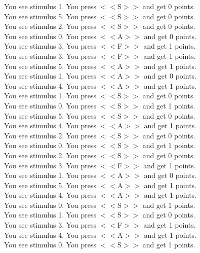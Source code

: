 \documentclass[pdflatex,sn-nature]{sn-jnl}%
\theoremstyle{thmstyleone}%
\theoremstyle{thmstyletwo}%
\theoremstyle{thmstylethree}%
\begin{document}
You see stimulus 1. You press $<<$S$>>$ and get 0 points. $~$\\ 
You see stimulus 5. You press $<<$S$>>$ and get 0 points. $~$\\ 
You see stimulus 2. You press $<<$S$>>$ and get 0 points. $~$\\ 
You see stimulus 0. You press $<<$A$>>$ and get 0 points. $~$\\ 
You see stimulus 3. You press $<<$F$>>$ and get 1 points. $~$\\ 
You see stimulus 3. You press $<<$F$>>$ and get 1 points. $~$\\ 
You see stimulus 5. You press $<<$A$>>$ and get 1 points. $~$\\ 
You see stimulus 1. You press $<<$A$>>$ and get 0 points. $~$\\ 
You see stimulus 4. You press $<<$A$>>$ and get 1 points. $~$\\ 
You see stimulus 1. You press $<<$S$>>$ and get 0 points. $~$\\ 
You see stimulus 0. You press $<<$S$>>$ and get 1 points. $~$\\ 
You see stimulus 5. You press $<<$S$>>$ and get 0 points. $~$\\ 
You see stimulus 4. You press $<<$A$>>$ and get 1 points. $~$\\ 
You see stimulus 2. You press $<<$S$>>$ and get 0 points. $~$\\ 
You see stimulus 0. You press $<<$S$>>$ and get 1 points. $~$\\ 
You see stimulus 2. You press $<<$S$>>$ and get 0 points. $~$\\ 
You see stimulus 3. You press $<<$F$>>$ and get 1 points. $~$\\ 
You see stimulus 1. You press $<<$A$>>$ and get 0 points. $~$\\ 
You see stimulus 5. You press $<<$A$>>$ and get 1 points. $~$\\ 
You see stimulus 4. You press $<<$A$>>$ and get 1 points. $~$\\ 
You see stimulus 0. You press $<<$S$>>$ and get 1 points. $~$\\ 
You see stimulus 1. You press $<<$S$>>$ and get 0 points. $~$\\ 
You see stimulus 3. You press $<<$F$>>$ and get 1 points. $~$\\ 
You see stimulus 4. You press $<<$A$>>$ and get 1 points. $~$\\ 
You see stimulus 0. You press $<<$S$>>$ and get 1 points. $~$\\ 
\end{document}
